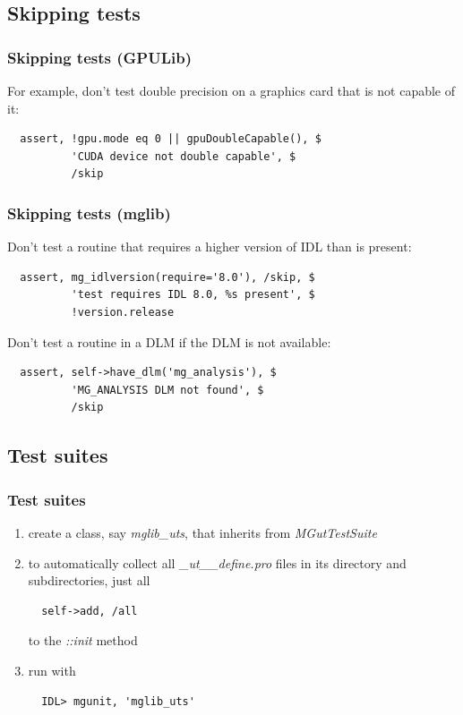 \documentclass[12pt, handout]{beamer}
\begin{document}
\subsection{Skipping tests}

\begin{frame}[t, fragile]
  \frametitle{Skipping tests (GPULib)}
For example, don't test double precision on a graphics card that is not capable of it:
\begin{lstlisting}
  assert, !gpu.mode eq 0 || gpuDoubleCapable(), $
          'CUDA device not double capable', $
          /skip
\end{lstlisting}
\end{frame}

\begin{frame}[t, fragile]
  \frametitle{Skipping tests (mglib)}
Don't test a routine that requires a higher version of IDL than is present:
\begin{lstlisting}
  assert, mg_idlversion(require='8.0'), /skip, $
          'test requires IDL 8.0, %s present', $
          !version.release
\end{lstlisting}
Don't test a routine in a DLM if the DLM is not available:
\begin{lstlisting}
  assert, self->have_dlm('mg_analysis'), $
          'MG_ANALYSIS DLM not found', $
          /skip
\end{lstlisting}

\end{frame}

\subsection{Test suites}

\begin{frame}[t, fragile]
  \hypertarget{suites}{}
  \frametitle{Test suites}
  \begin{enumerate}
    \item create a class, say {\em mglib\_uts}, that inherits from {\em MGutTestSuite}
    \item to automatically collect all {\em \_ut\_\_define.pro} files in its directory and subdirectories, just all
\begin{lstlisting}
  self->add, /all
\end{lstlisting}
to the {\em ::init} method
    \item run with
\begin{lstlisting}
  IDL> mgunit, 'mglib_uts'
\end{lstlisting}
  \end{enumerate}
\end{frame}
\end{document}
